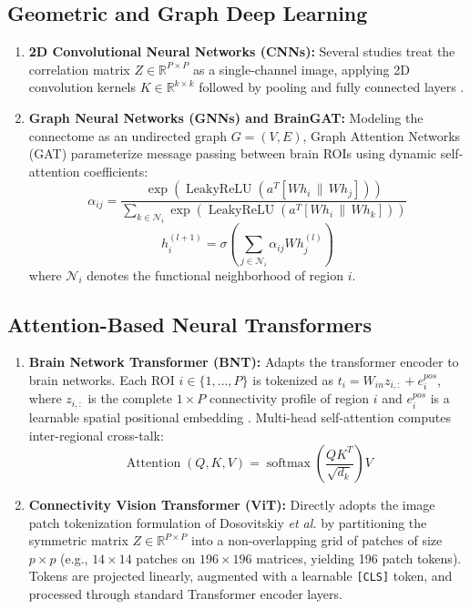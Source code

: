 \documentclass[journal]{IEEEtran}
\begin{document}
\subsection{Geometric and Graph Deep Learning}
\begin{enumerate}
    \item \textbf{2D Convolutional Neural Networks (CNNs):} Several studies treat the correlation matrix $Z \in \mathbb{R}^{P \times P}$ as a single-channel image, applying 2D convolution kernels $K \in \mathbb{R}^{k \times k}$ followed by pooling and fully connected layers \cite{li2018brain, heinsfeld2018identification}.
    \item \textbf{Graph Neural Networks (GNNs) and BrainGAT:} Modeling the connectome as an undirected graph $G = (V, E)$, Graph Attention Networks (GAT) \cite{velickovic2018graph} parameterize message passing between brain ROIs using dynamic self-attention coefficients:
    \begin{equation}
    \alpha_{ij} = \frac{\exp\left(\operatorname{LeakyReLU}\left(a^T [W h_i \,\|\, W h_j]\right)\right)}{\sum_{k \in \mathcal{N}_i} \exp\left(\operatorname{LeakyReLU}\left(a^T [W h_i \,\|\, W h_k]\right)\right)}
    \end{equation}
    \begin{equation}
    h_i^{(l+1)} = \sigma\left(\sum_{j \in \mathcal{N}_i} \alpha_{ij} W h_j^{(l)}\right)
    \end{equation}
    where $\mathcal{N}_i$ denotes the functional neighborhood of region $i$.
\end{enumerate}

\subsection{Attention-Based Neural Transformers}
\begin{enumerate}
    \item \textbf{Brain Network Transformer (BNT):} Adapts the transformer encoder \cite{vaswani2017attention} to brain networks. Each ROI $i \in \{1, \dots, P\}$ is tokenized as $t_i = W_{in} z_{i,:} + e_i^{pos}$, where $z_{i,:}$ is the complete $1 \times P$ connectivity profile of region $i$ and $e_i^{pos}$ is a learnable spatial positional embedding \cite{kan2022brain}. Multi-head self-attention computes inter-regional cross-talk:
    \begin{equation}
    \operatorname{Attention}(Q, K, V) = \operatorname{softmax}\left(\frac{Q K^T}{\sqrt{d_k}}\right) V
    \end{equation}
    \item \textbf{Connectivity Vision Transformer (ViT):} Directly adopts the image patch tokenization formulation of Dosovitskiy \textit{et al.} \cite{dosovitskiy2020image} by partitioning the symmetric matrix $Z \in \mathbb{R}^{P \times P}$ into a non-overlapping grid of patches of size $p \times p$ (e.g., $14 \times 14$ patches on $196 \times 196$ matrices, yielding 196 patch tokens). Tokens are projected linearly, augmented with a learnable \texttt{[CLS]} token, and processed through standard Transformer encoder layers.
\end{enumerate}
\end{document}

